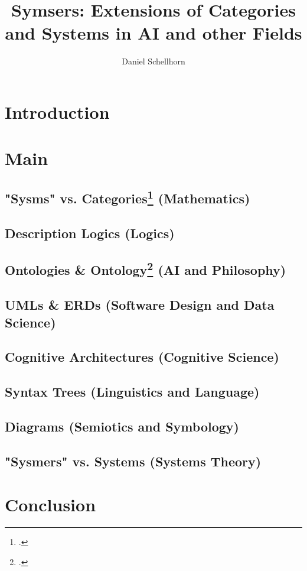 \documentclass[12pt,a4paper]{article}
\title{Symsers: Extensions of Categories and Systems in AI and other Fields}
\author{Daniel Schellhorn}
\begin{document}
\maketitle

\section{Introduction}

\section{Main}

\subsection{"Sysms" vs. Categories\footcite{MacLane1997} (Mathematics)}
\subsection{Description Logics (Logics)}

\subsection{Ontologies \& Ontology\footcite{Platon2010} (AI and Philosophy)}

\subsection{UMLs \& ERDs (Software Design and Data Science)}

\subsection{Cognitive Architectures (Cognitive Science)}

\subsection{Syntax Trees (Linguistics and Language)}
\subsection{Diagrams (Semiotics and Symbology)} 

\subsection{"Sysmers" vs. Systems (Systems Theory)}


\section{Conclusion}


\printbibliography
\end{document}
